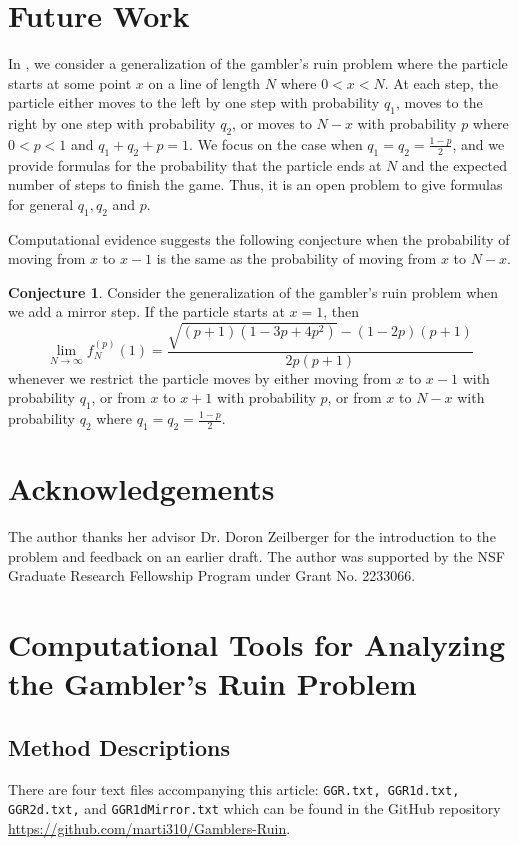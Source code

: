 \documentclass[reqno]{amsart}
\theoremstyle{definition}
\newtheorem{conjecture}[theorem]{Conjecture}
\theoremstyle{definition}
\theoremstyle{remark}
\begin{document}
\section{Future Work }\label{sec:future}  

In , we consider a generalization of the gambler's ruin problem where the particle starts at some point $x$ on a line of length $N$ where $0< x <N$. At each step, the particle either moves to the left by one step with probability $q_1$, moves to the right by one step with probability $q_2$, or moves to $N-x$ with probability $p$ where $0<p<1$ and $q_1+q_2+p=1$. We focus on the case when $q_1=q_2=\frac{1-p}{2}$, and we provide formulas for the probability that the particle ends at $N$ and the expected number of steps to finish the game. Thus, it is an open problem to give formulas for general $q_1, q_2$ and $p$. 

Computational evidence suggests the following conjecture when the probability of moving from $x$ to $x-1$ is the same as the probability of moving from $x$ to $N-x$. 
\begin{conjecture}
Consider the generalization of the gambler's ruin problem when we add a mirror step. If the particle starts at $x=1$, then
\[\lim_{N\to \infty} f_N^{(p)}(1)= \frac{\sqrt{(p+1)(1-3p+4p^2)}-(1-2p)(p+1)}{2p(p+1)}\]
whenever we restrict the particle moves by either moving from $x$ to $x-1$ with probability $q_1$, or from $x$ to $x+1$ with probability $p$, or from $x$ to $N-x$ with probability $q_2$ where $q_1=q_2=\frac{1-p}{2}$.
\end{conjecture}



\section*{Acknowledgements}
The author thanks her advisor Dr. Doron Zeilberger for the introduction
to the problem and feedback on an earlier draft. The author was supported by the NSF Graduate Research Fellowship Program under Grant No. 2233066.







\appendix
\section{Computational Tools for Analyzing the Gambler's Ruin Problem}\label{appendix:maple}
\subsection{Method Descriptions}
There are four text files accompanying this article: \lstinline{GGR.txt, GGR1d.txt, GGR2d.txt,} and \lstinline{GGR1dMirror.txt} which can be found in the GitHub repository \\
\href{https://github.com/marti310/Gamblers-Ruin}{https://github.com/marti310/Gamblers-Ruin}.
\end{document}
